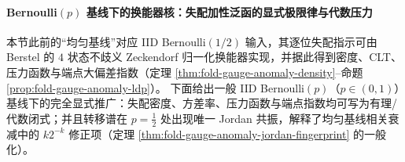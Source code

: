 \paragraph{Bernoulli\texorpdfstring{$(p)$}{(p)} 基线下的换能器核：失配加性泛函的显式极限律与代数压力}\label{par:fold-gauge-anomaly-bernoulli-p}
本节此前的“均匀基线”对应 IID Bernoulli\((1/2)\) 输入，其逐位失配指示可由 Berstel 的 \(4\) 状态不歧义 Zeckendorf 归一化换能器实现，并据此得到密度、CLT、压力函数与端点大偏差指数（定理 \ref{thm:fold-gauge-anomaly-density}--命题 \ref{prop:fold-gauge-anomaly-ldp}）。
下面给出一般 IID Bernoulli\((p)\)（\(p\in(0,1)\)）基线下的完全显式推广：失配密度、方差率、压力函数与端点指数均可写为有理/代数闭式；并且转移谱在 \(p=\tfrac12\) 处出现唯一 Jordan 共振，解释了均匀基线相关衰减中的 \(k2^{-k}\) 修正项（定理 \ref{thm:fold-gauge-anomaly-jordan-fingerprint} 的一般化）。

